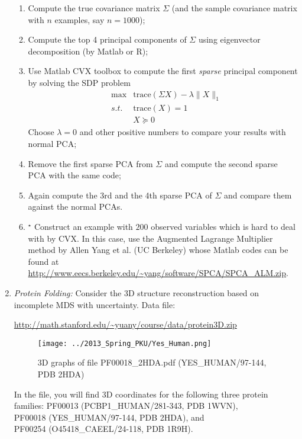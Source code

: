 \documentclass[11pt]{article}
\def\tr{{\mathrm{trace}}}
\begin{document}
\begin{enumerate}
\begin{enumerate}
\item Compute the true covariance matrix $\Sigma$ (and the sample covariance matrix with $n$ examples, say $n=1000$);
\item Compute the top 4 principal components of $\Sigma$ using eigenvector decomposition (by Matlab or R);
\item Use Matlab CVX toolbox to compute the first \emph{sparse} principal component by solving the SDP problem
\begin{eqnarray*}
& \max & \tr (\Sigma X) - \lambda \|X\|_1 \\
 & s.t. & \tr (X) = 1 \\
 & & X \succeq 0
\end{eqnarray*}
Choose $\lambda =0$ and other positive numbers to compare your results with normal PCA;  

\item Remove the first sparse PCA from $\Sigma$ and compute the second sparse PCA with the same code;
\item Again compute the 3rd and the 4th sparse PCA of $\Sigma$ and compare them against the normal PCAs.  
\item $^\star$ Construct an example with $200$ observed variables which is hard to deal with by CVX. 
In this case, use the Augmented Lagrange Multiplier method by Allen Yang et al. (UC Berkeley) whose Matlab codes can be found at 
\url{http://www.eecs.berkeley.edu/~yang/software/SPCA/SPCA_ALM.zip}. 
\end{enumerate}

\item{\em Protein Folding:} Consider the 3D structure reconstruction based on incomplete MDS with uncertainty. Data file: 

\url{http://math.stanford.edu/~yuany/course/data/protein3D.zip}

\begin{figure}[htbp]
\begin{center}
\texttt{[image: ../2013\_Spring\_PKU/Yes\_Human.png]}  
\caption{3D graphs of file PF00018\_2HDA.pdf (YES\_HUMAN/97-144, PDB 2HDA)}
\label{yes_human}
\end{center}
\end{figure}

\noindent In the file, you will find 3D coordinates for the following three protein families: 
\subitem PF00013 (PCBP1\_HUMAN/281-343, PDB 1WVN), \\
\subitem PF00018 (YES\_HUMAN/97-144, PDB 2HDA), and \\
\subitem PF00254 (O45418\_CAEEL/24-118, PDB 1R9H). \\


\end{enumerate}
\end{document}
